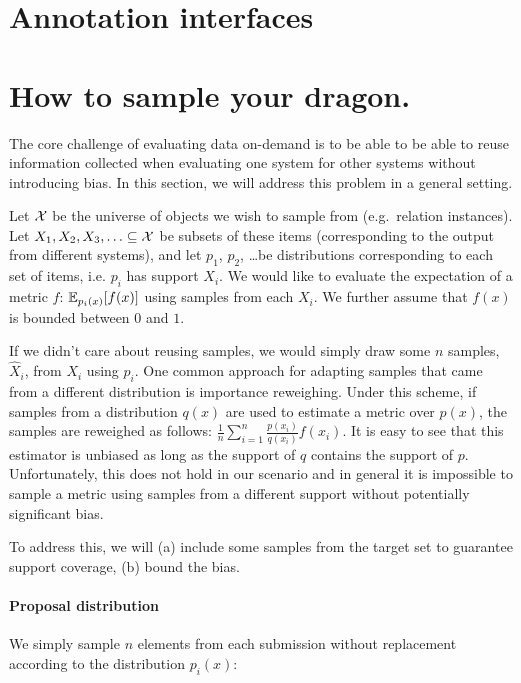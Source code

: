 \onecolumn
\section{Annotation interfaces}
\label{sec:interface}

\section{How to sample your dragon.}
\label{sec:sampling}

\newcommand{\Xh}{{\hat{X}}}

The core challenge of evaluating data on-demand is to be able to be able to reuse information collected when evaluating one system for other systems without introducing bias.
In this section, we will address this problem in a general setting.

Let $\mathcal{X}$ be the universe of objects we wish to sample from (e.g.\ relation instances).
Let $X_1, X_2, X_3, \ldots \subseteq \mathcal{X}$ be subsets of these items (corresponding to the output from different systems),
and let $p_1$, $p_2$, \ldots be distributions corresponding to each set of items, i.e. $p_i$ has support $X_i$.
We would like to evaluate the expectation of a metric $f$: $\mathbb{E}_{p_i(x)}[f(x)]$ using samples from each $X_i$. We further assume that $f(x)$ is bounded between $0$ and $1$.

If we didn't care about reusing samples, we would simply draw some $n$ samples, $\Xh_i$, from $X_i$ using $p_i$.
One common approach for adapting samples that came from a different distribution is importance reweighing.
Under this scheme, if samples from a distribution $q(x)$ are used to estimate a metric over $p(x)$, the samples are reweighed as follows: $\frac{1}{n} \sum_{i=1}^n \frac{p(x_i)}{q(x_i)} f(x_i)$.
It is easy to see that this estimator is unbiased as long as the support of $q$ contains the support of $p$.
Unfortunately, this does not hold in our scenario and in general it is impossible to sample a metric using samples from a different support without potentially significant bias.

To address this, we will (a) include some samples from the target set to guarantee support coverage, (b) bound the bias.

\paragraph{Proposal distribution}
We simply sample $n$ elements from each submission without replacement according to the distribution $p_i(x)$:
\begin{algorithm}
\begin{algorithmic}
\ENDFOR{}
\end{algorithmic}
\end{algorithm}


